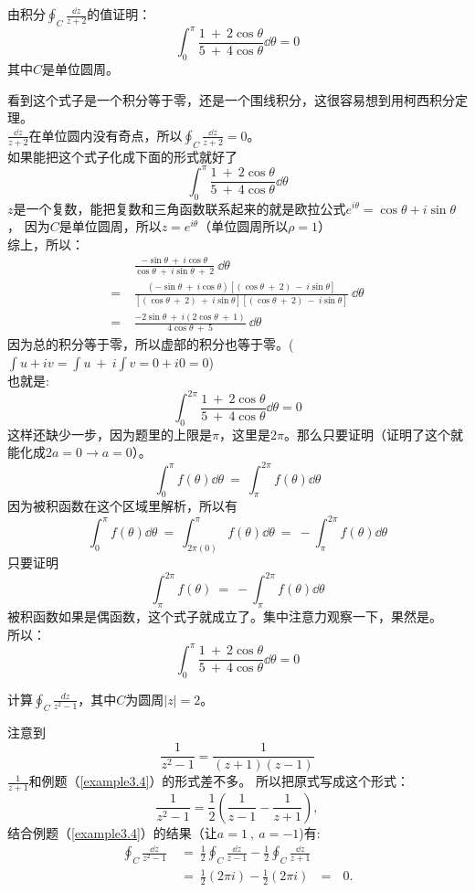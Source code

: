 \documentclass[cn,hazy,blue,14pt,normal]{elegantnote}
\numberwithin{equation}{section}
\begin{document}
\begin{example}\label{example3.4}
	由积分$\oint_C \frac{\dd z}{z+2}$的值证明：
	$$ \int_{0}^{\pi}\frac{1~+~2\cos\theta}{5~+~4\cos\theta}\dd \theta = 0 $$
	其中$C$是单位圆周。
\end{example}
看到这个式子是一个积分等于零，还是一个围线积分，这很容易想到用柯西积分定理。\\
$\frac{\dd z}{z+2}$在单位圆内没有奇点，所以$\oint_C \frac{\dd z}{z+2} = 0$。\\
如果能把这个式子化成下面的形式就好了
$$\int_{0}^{\pi}\frac{1~+~2\cos\theta}{5~+~4\cos\theta}\dd \theta$$
$z$是一个复数，能把复数和三角函数联系起来的就是欧拉公式$e^{i\theta} = \cos\theta + i\sin\theta$，
因为$C$是单位圆周，所以$z = e^{i\theta}$（单位圆周所以$\rho = 1$）\\
综上，所以：
\begin{align*}
&\frac{-\sin\theta~+~i\cos\theta}{\cos\theta~+~i\sin\theta~+~2}~\dd \theta\\
=~& \frac{\left(-\sin\theta~+~i\cos\theta\right)\left[(\cos\theta~+~2)~-~i\sin\theta\right]}
{\left[(\cos\theta~+~2)~+~i\sin\theta\right]\left[(\cos\theta~+~2)~-~i\sin\theta\right]}~\dd\theta\\
=~& \frac{-2\sin\theta~+~i\left(2\cos\theta~+~1\right)}{4\cos\theta~+~5}~\dd\theta
\end{align*}
因为总的积分等于零，所以虚部的积分也等于零。($\int u+iv = \int u~+~i\int v = 0+i0 = 0$)\\
也就是:
$$ \int_{0}^{2\pi}\frac{1~+~2\cos\theta}{5~+~4\cos\theta}\dd \theta = 0 $$
这样还缺少一步，因为题里的上限是$\pi$，这里是$2\pi$。那么只要证明（证明了这个就能化成$2a=0 \to a=0$）。
$$ \int_{0}^{\pi} f(\theta) \dd \theta ~=~ \int_{\pi}^{2\pi} f(\theta) \dd \theta $$
因为被积函数在这个区域里解析，所以有
$$\int_{0}^{\pi} f(\theta) \dd \theta ~=~ \int_{2\pi(0)}^{\pi} f(\theta) \dd \theta ~=~ -\int_{\pi}^{2\pi} f(\theta) \dd \theta$$
只要证明
$$\int_{\pi}^{2\pi} f(\theta) ~=~ -\int_{\pi}^{2\pi} f(\theta) \dd \theta$$
被积函数如果是偶函数，这个式子就成立了。集中注意力观察一下，果然是。\\
所以：
$$ \int_{0}^{\pi}\frac{1~+~2\cos\theta}{5~+~4\cos\theta}\dd \theta = 0 $$

\begin{example}
	计算$\oint_C \frac{dz}{z^2 -1}$，其中$C$为圆周$|z|=2$。
\end{example}
注意到
$$\frac{1}{z^2 -1} = \frac{1}{(z+1)(z-1)}$$
$\frac{1}{z+1}$和例题（\ref{example3.4}）的形式差不多。
所以把原式写成这个形式：
$$
\frac{1}{z^2 -1} = \frac{1}{2}( \frac{1}{z-1} - \frac{1}{z+1} ),
$$
结合例题（\ref{example3.4}）的结果（让$a = 1~,~a = -1$)有:
\begin{align*}
\oint_C \frac{\dd z}{z^2 -1} &~=~\frac{1}{2}\oint_C \frac{\dd z}{z-1} - \frac{1}{2} \oint_C \frac{\dd z}{z+1}
\nonumber\\
&~=~\frac{1}{2}(2\pi i) - \frac{1}{2}(2\pi i) ~~~=~~~ 0.
\end{align*}
\end{document}
